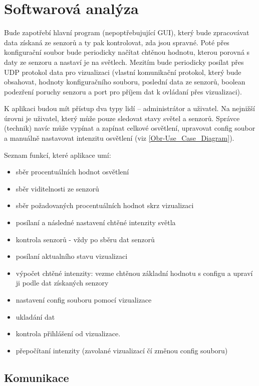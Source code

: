 \chapter{Softwarová analýza}

Bude zapotřebí hlavní program (nepoptřebujující GUI), který bude zpracovávat data získaná ze senzorů a ty pak kontrolovat, zda jsou spravné. Poté přes konfigurační soubor bude periodicky načítat chtěnou hodnotu, kterou porovná s daty ze senzoru a nastaví je na světlech. Mezitím bude periodicky posílat přes UDP protokol data pro vizualizaci (vlastní komunikační protokol, který bude obsahovat, hodnoty konfiguračního souboru, poslední data ze senzorů, boolean podezření poruchy senzoru a port pro příjem dat k ovládaní přes vizualizaci).

K aplikaci budou mít přístup dva typy lidí -- administrátor a uživatel. Na nejnižší úrovni je uživatel, který může pouze sledovat stavy světel a senzorů. Správce (technik) navíc může vypínat a zapínat celkové osvětlení, upravovat config soubor a manuálně nastavovat intenzitu osvětlení (viz \autoref{Obr-Use_Case_Diagram}). 


Seznam funkcí, které aplikace umí:

\begin{itemize}
    \item sběr procentuálních hodnot osvětlení
    \item sběr viditelnosti ze senzorů
    \item sběr požadovaných procentuálních hodnot skrz vizualizaci
    \item posílaní a následné nastavení chtěné intenzity světla
    \item kontrola senzorů - vždy po sběru dat senzorů
    \item posílaní aktualního stavu vizualizaci
    \item výpočet chtěné intenzity: vezme chtěnou základní hodnotu s configu a upraví ji podle dat získaných senzory 
    \item nastavení config souboru pomocí vizualizace
    \item ukladání dat
    \item kontrola přihlášení od vizualizace.
    \item přepočítaní intenzity (zavolané vizualizací čí změnou config souboru)
\end{itemize}

\section{Komunikace}

